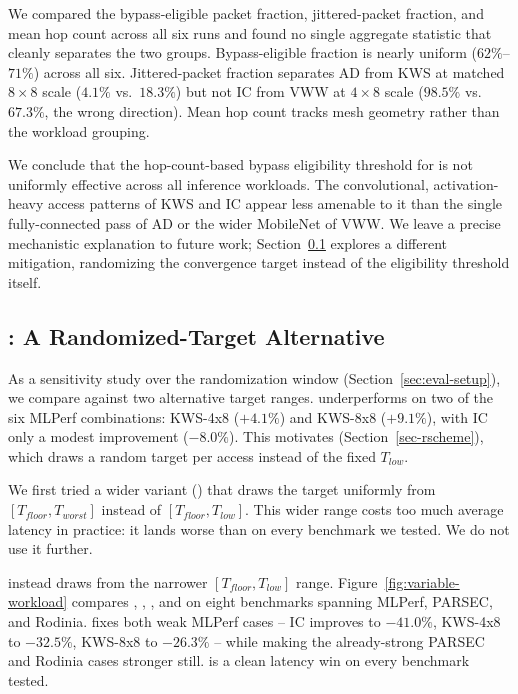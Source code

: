 We compared the bypass-eligible packet fraction, jittered-packet fraction, and mean hop count across all six runs and found no single aggregate statistic that cleanly separates the two groups.
Bypass-eligible fraction is nearly uniform ($62\%$--$71\%$) across all six. 
Jittered-packet fraction separates AD from KWS at matched $8\times8$ scale ($4.1\%$ vs.\ $18.3\%$) but not IC from VWW at $4\times8$ scale ($98.5\%$ vs.\ $67.3\%$, the wrong direction).
Mean hop count tracks mesh geometry rather than the workload grouping.

We conclude that the hop-count-based bypass eligibility threshold for \bscheme{} is not uniformly effective across all inference workloads. 
The convolutional, activation-heavy access patterns of KWS and IC appear less amenable to it than the single fully-connected pass of AD or the wider MobileNet of VWW. 
We leave a precise mechanistic explanation to future work; Section~\ref{sec:eval-rand} explores a different mitigation, randomizing the convergence target instead of the eligibility threshold itself.

\subsection{\rscheme{}: A Randomized-Target Alternative} \label{sec:eval-rand}
As a sensitivity study over the randomization window (Section~\ref{sec:eval-setup}), we compare \bscheme{} against two alternative target ranges.
\bscheme{} underperforms on two of the six MLPerf combinations: KWS-4x8 ($+4.1\%$) and KWS-8x8 ($+9.1\%$), with IC only a modest improvement ($-8.0\%$).
This motivates \rscheme{} (Section~\ref{sec-rscheme}), which draws a random target per access instead of the fixed $T_{low}$.

We first tried a wider variant (\rejscheme{}) that draws the target uniformly from $[T_{floor}, T_{worst}]$ instead of $[T_{floor}, T_{low}]$.
This wider range costs too much average latency in practice: it lands worse than \basescheme{} on every benchmark we tested.
We do not use it further.

\rscheme{} instead draws from the narrower $[T_{floor}, T_{low}]$ range.
Figure~\ref{fig:variable-workload} compares \basebscheme{}, \bscheme{}, \rejscheme{}, and \rscheme{} on eight benchmarks spanning MLPerf, PARSEC, and Rodinia.
\rscheme{} fixes both weak MLPerf cases -- IC improves to $-41.0\%$, KWS-4x8 to $-32.5\%$, KWS-8x8 to $-26.3\%$ -- while making the already-strong PARSEC and Rodinia cases stronger still.
\rscheme{} is a clean latency win on every benchmark tested.

